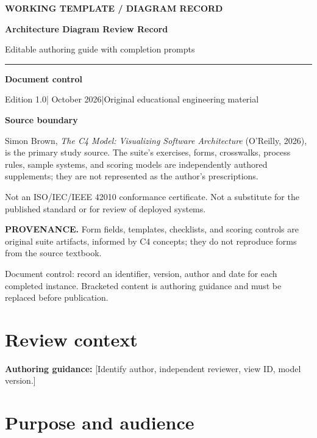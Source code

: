 \documentclass[10pt,letterpaper]{article}
\newcommand{\WritingSpace}[1]{\par\vspace{2pt}\noindent\fcolorbox{C4Line}{white}{\parbox[t][#1][t]{0.94\linewidth}{\hspace{1pt}}}\par\vspace{7pt}}
\newcommand{\Prompter}[1]{\par{\small\color{C4Teal}\textbf{Authoring guidance:} #1}\par}
\newcommand{\SourceNote}[1]{\par\smallskip\noindent\colorbox{C4Light}{\parbox{0.94\linewidth}{\footnotesize\textbf{PROVENANCE.} #1}}\par\medskip}
\newcommand{\DocStart}[3]{%
\begin{document}
\begin{titlepage}
\renewcommand{\thepage}{title-\arabic{page}}
\vspace*{0.55in}
{\sffamily\bfseries\small\color{C4Teal}#1}\par\vspace{0.24in}
{\sffamily\bfseries\fontsize{26}{31}\selectfont\color{C4Navy}#2}\par\vspace{0.18in}
{\large\color{C4Gray}#3}\par\vspace{0.4in}
\textcolor{C4Teal}{\rule{\linewidth}{1.15pt}}\par\vspace{0.24in}
\textbf{Document control}\par
Edition 1.0\quad|\quad 30 October 2026\quad|\quad Original educational engineering material\par
\vspace{0.17in}
\textbf{Source boundary}\par
Simon Brown, \emph{The C4 Model: Visualizing Software Architecture} (O'Reilly, 2026), is the primary study source. The suite's exercises, forms, crosswalks, process rules, sample systems, and scoring models are independently authored supplements; they are not represented as the author's prescriptions.\par
\vfill
{\small\color{C4Gray}Not an ISO/IEC/IEEE 42010 conformance certificate. Not a substitute for the published standard or for review of deployed systems.}\par
\end{titlepage}
}
\DocStart{WORKING TEMPLATE / DIAGRAM RECORD}{Architecture Diagram Review Record}{Editable authoring guide with completion prompts}
\SourceNote{Form fields, templates, checklists, and scoring controls are original suite artifacts, informed by C4 concepts; they do not reproduce forms from the source textbook.}
Document control: record an identifier, version, author and date for each completed instance. Bracketed content is authoring guidance and must be replaced before publication.

\section{Review context}

\Prompter{[Identify author, independent reviewer, view ID, model version.]}
\WritingSpace{0.65in}
\section{Purpose and audience}
\end{document}

